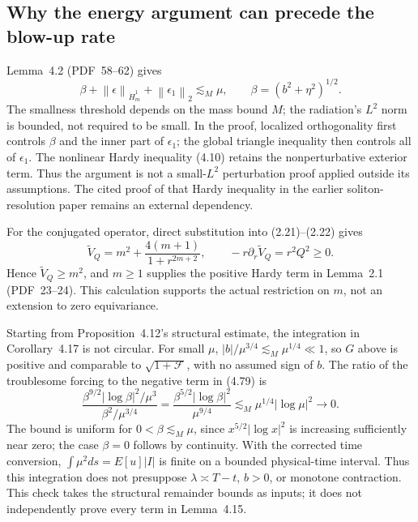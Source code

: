 \documentclass[10pt]{article}
\begin{document}
\subsection*{Why the energy argument can precede the blow-up rate}
Lemma 4.2 (PDF 58–62) gives \[\beta+\left\|\epsilon\right\|_{\dot H_m^1}
+\left\|\epsilon_1\right\|_2\lesssim_M\mu,\qquad
\beta=(b^2+\eta^2)^{1/2}.\] The smallness threshold depends on the mass bound \(M\); the radiation’s \(L^2\) norm is bounded, not required to be small. In the proof, localized orthogonality first controls \(\beta\) and the inner part of \(\epsilon_1\); the global triangle inequality then controls all of \(\epsilon_1\). The nonlinear Hardy inequality (4.10) retains the nonperturbative exterior term. Thus the argument is not a small-\(L^2\) perturbation proof applied outside its assumptions. The cited proof of that Hardy inequality in the earlier soliton-resolution paper remains an external dependency.\par
For the conjugated operator, direct substitution into (2.21)–(2.22) gives \[\widetilde V_Q=m^2+\frac{4(m+1)}{1+r^{2m+2}},
\qquad -r\partial_r\widetilde V_Q=r^2Q^2\ge0 .\] Hence \(\widetilde V_Q\ge m^2\), and \(m\ge1\) supplies the positive Hardy term in Lemma 2.1 (PDF 23–24). This calculation supports the actual restriction on \(m\), not an extension to zero equivariance.\par
Starting from Proposition 4.12’s structural estimate, the integration in Corollary 4.17 is not circular. For small \(\mu\), \(|b|/\mu^{3/4}\lesssim_M\mu^{1/4}\ll1\), so \(G\) above is positive and comparable to \(\sqrt{1+\mathcal F}\), with no assumed sign of \(b\). The ratio of the troublesome forcing to the negative term in (4.79) is \[\frac{\beta^{9/2}|\log\beta|^2/\mu^3}
     {\beta^2/\mu^{3/4}}
=\frac{\beta^{5/2}|\log\beta|^2}{\mu^{9/4}}
\lesssim_M\mu^{1/4}|\log\mu|^2\longrightarrow0.\] The bound is uniform for \(0<\beta\lesssim_M\mu\), since \(x^{5/2}|\log x|^2\) is increasing sufficiently near zero; the case \(\beta=0\) follows by continuity. With the corrected time conversion, \(\int\mu^2ds=E[u]|I|\) is finite on a bounded physical-time interval. Thus this integration does not presuppose \(\lambda\asymp T-t\), \(b>0\), or monotone contraction. This check takes the structural remainder bounds as inputs; it does not independently prove every term in Lemma 4.15.\par
\end{document}
